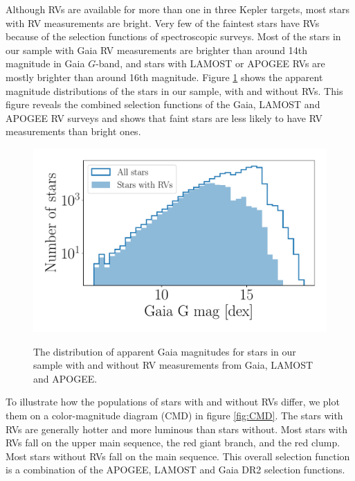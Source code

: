 \documentclass[]{aastex631}
\newcommand{\gaia}{{\it Gaia}}
\newcommand{\lamost}{{\it LAMOST}}
\begin{document}
Although RVs are available for more than one in three Kepler targets, most
stars with RV measurements are bright.
Very few of the faintest stars have RVs because of the selection functions of
spectroscopic surveys.
Most of the stars in our sample with Gaia RV measurements are brighter than
around 14th magnitude in Gaia $G$-band, and stars with LAMOST or APOGEE RVs
are mostly brighter than around 16th magnitude.
Figure \ref{fig:rv_histogram} shows the apparent magnitude distributions of
the stars in our sample, with and without RVs.
This figure reveals the combined selection functions of the Gaia, LAMOST and
APOGEE RV surveys and shows that faint stars are less likely to have RV
measurements than bright ones.
\begin{figure}[ht!]
\caption{
    The distribution of apparent Gaia magnitudes for
    stars in our sample with and without RV measurements from Gaia, LAMOST and
    APOGEE.
}
  \centering \includegraphics[width=.5\textwidth]{rv_histogram}
\label{fig:rv_histogram}
\end{figure}

To illustrate how the populations of stars with and without RVs differ, we
plot them on a color-magnitude diagram (CMD) in figure \ref{fig:CMD}.
The stars with RVs are generally hotter and more luminous than stars without.
Most stars with RVs fall on the upper main sequence, the red giant branch, and
the red clump.
Most stars without RVs fall on the main sequence.
This overall selection function is a combination of the APOGEE, LAMOST and
Gaia DR2 selection functions.
\end{document}
